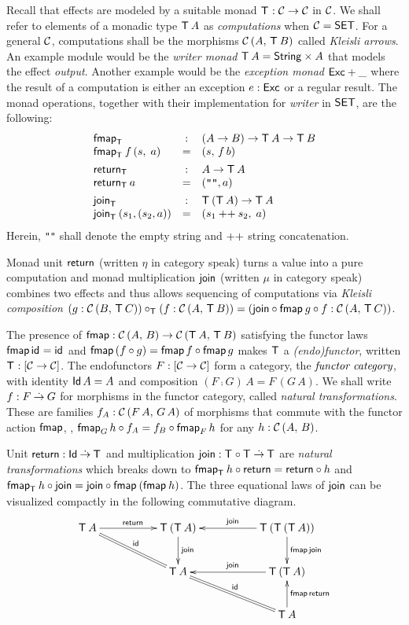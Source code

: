 \documentclass[acmsmall,review,anonymous]{acmart}\settopmatter{printfolios=true,printccs=false,printacmref=false}
\theoremstyle{remark}
\begin{document}
Recall that effects are modeled by a suitable monad $\T : \CC \to \CC$
in $\CC$.  We shall refer to elements of a monadic type $\T\,A$ as
\emph{computations} when $\CC = \SET$.  For a general $\CC$,
computations shall be the morphisms $\Hom A {\T\,B}$ called
\emph{Kleisli arrows}.
An example module would be the \emph{writer monad}
$\T\,A = \String \times A$
that models the effect \emph{output}.
Another example would be the \emph{exception monad} $\Exc + \_$ where
the result of a computation is either an exception $e : \Exc$ or a
regular result.
The monad operations, together with
their implementation for \emph{writer} in $\SET$, are the following:
\[
\begin{array}{lcl}
\fmap[\T] & : & (A \to B) \to \T\,A \to \T\,B \\
\fmap[\T] f\, (s,\; a) & = & (s,\, f\, b)
\\[1ex]
\return[\T] & : & A \to \T\,A \\
\return[\T]\, a & = & (\verb|""|, a)
\\[1ex]
\join[\T] & : & \T\,(\T\,A) \to \T\,A \\
\join[\T]\,(s_1,(s_2,a)) & = & (s_1 \append s_2,\; a) \\
\end{array}
\]
Herein, \verb|""| shall denote the empty string and $\append$ string
concatenation.

Monad unit $\treturn$ (written $\eta$ in category speak) turns a value
into a pure computation and monad multiplication $\tjoin$ (written
$\mu$ in category speak) combines two effects and thus allows
sequencing of computations via \emph{Kleisli composition}
$ (g : \Hom B {\T\,C}) \comp_{\T} (f : \Hom A {\T\,B}) = (\tjoin \comp
  \fmap g \comp f : \Hom A {\T\,C})$.

The presence of $\tfmap : \Hom A B \to \Hom {\T\,A} {\T\,B}$
satisfying the functor laws $\tfmap\,\tid = \tid$ and
$\tfmap\,(f \circ g) = \tfmap\,f \circ \tfmap\,g$ makes $\T$ a
\emph{(endo)functor}, written $\T : [\CC \to \CC]$.  The
endofunctors $F : [\CC \to \CC]$ form a category, the
$\emph{functor category}$, with identity $\Id\,A = A$ and
composition $(F \comp G)\,A = F\,(G\,A)$.  We shall write
$f : F \todot G$ for morphisms in the functor category, called
\emph{natural transformations}.  These are families
$f_A : \Hom {F\,A} {G\,A}$ of morphisms that commute with the
functor action $\tfmap$, \ie,
$\fmap[G]h \comp f_A = f_B \comp \fmap[F]h$ for any $h : \Hom A B$.

Unit $\treturn : \Id \todot \T$ and multiplication
$\tjoin : \T \comp \T \todot \T$ are \emph{natural transformations}
which breaks down to $\fmap[\T] h \comp \treturn = \treturn \comp h$
and $\fmap[\T] h \comp \tjoin = \tjoin \comp \fmap{(\fmap h)}$.
%
The three equational
laws of $\tjoin$ can be visualized compactly in the following
commutative diagram.
\[
\xymatrix@C=12ex{
  \T\,A     \ar[r]^{\treturn} \ar@{=}[dr]^{\tid}
& \T\,(\T\,A) \ar[d]^{\tjoin}
& \T\,(\T\,(\T\,A)) \ar[l]_{\tjoin} \ar[d]^{\tfmap\,\tjoin}
\\
& \T\,A       \ar@{=}[dr]^{\tid}
& \T\,(\T\,A) \ar[l]_{\tjoin}
\\
&
& \T\,A \ar[u]_{\tfmap\,\treturn}
}
\]
\end{document}
